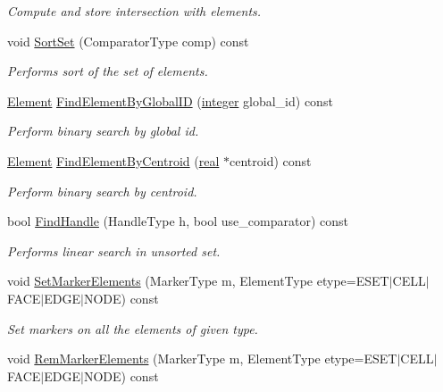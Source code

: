 \begin{DoxyCompactItemize}
\begin{DoxyCompactList}\small\item\em Compute and store intersection with elements. \end{DoxyCompactList}\item 
void \hyperlink{classINMOST_1_1ElementSet_a96676712005ce12f0c1f9a92c6ac095d}{Sort\-Set} (Comparator\-Type comp) const 
\begin{DoxyCompactList}\small\item\em Performs sort of the set of elements. \end{DoxyCompactList}\item 
\hyperlink{classINMOST_1_1Element}{Element} \hyperlink{classINMOST_1_1ElementSet_aa4fac35a59d299c9dca99b0434a127e7}{Find\-Element\-By\-Global\-I\-D} (\hyperlink{classINMOST_1_1Storage_aec96942bc647417a801e2895b45964d2}{integer} global\-\_\-id) const 
\begin{DoxyCompactList}\small\item\em Perform binary search by global id. \end{DoxyCompactList}\item 
\hyperlink{classINMOST_1_1Element}{Element} \hyperlink{classINMOST_1_1ElementSet_ad1921b1662920da28e5f958fd397f448}{Find\-Element\-By\-Centroid} (\hyperlink{classINMOST_1_1Storage_a853346784b4a5822a7fac54d8f10f805}{real} $\ast$centroid) const 
\begin{DoxyCompactList}\small\item\em Perform binary search by centroid. \end{DoxyCompactList}\item 
bool \hyperlink{classINMOST_1_1ElementSet_acb23b3c8a46fe1b04d486cf4a173365a}{Find\-Handle} (Handle\-Type h, bool use\-\_\-comparator) const 
\begin{DoxyCompactList}\small\item\em Performs linear search in unsorted set. \end{DoxyCompactList}\item 
\hypertarget{classINMOST_1_1ElementSet_a17022215a9a701dfad2e77b3eb8c1429}{void \hyperlink{classINMOST_1_1ElementSet_a17022215a9a701dfad2e77b3eb8c1429}{Set\-Marker\-Elements} (Marker\-Type m, Element\-Type etype=E\-S\-E\-T$|$C\-E\-L\-L$|$F\-A\-C\-E$|$E\-D\-G\-E$|$N\-O\-D\-E) const }\label{classINMOST_1_1ElementSet_a17022215a9a701dfad2e77b3eb8c1429}

\begin{DoxyCompactList}\small\item\em Set markers on all the elements of given type. \end{DoxyCompactList}\item 
\hypertarget{classINMOST_1_1ElementSet_afa202ba264c8c6993c3943586f6dd4ee}{void \hyperlink{classINMOST_1_1ElementSet_afa202ba264c8c6993c3943586f6dd4ee}{Rem\-Marker\-Elements} (Marker\-Type m, Element\-Type etype=E\-S\-E\-T$|$C\-E\-L\-L$|$F\-A\-C\-E$|$E\-D\-G\-E$|$N\-O\-D\-E) const }\label{classINMOST_1_1ElementSet_afa202ba264c8c6993c3943586f6dd4ee}


\end{DoxyCompactItemize}
